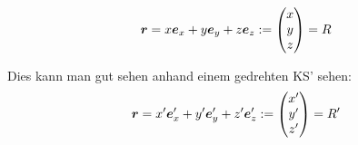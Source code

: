 \begin{sectionbox}\nospacing
 \begin{equation*}
   \vec{r}=x\vec{e}_x+y\vec{e}_y+z\vec{e}_z:=\vect{x \\ y \\ z}=R 
 \end{equation*} 
\end{sectionbox}
\begin{notebox}
  Dies kann man gut sehen anhand einem gedrehten KS' sehen:
 \begin{equation*}
   \vec{r}=x'\vec{e}'_x+y'\vec{e}'_y+z'\vec{e}'_z:=\vect{x' \\ y' \\ z'}=R' 
 \end{equation*} 
\end{notebox}

